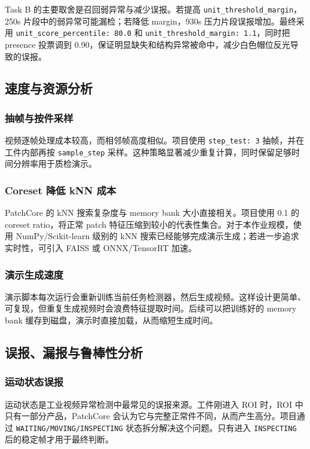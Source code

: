 \documentclass[12pt,hyperref,a4paper,UTF8,fontset=fandol]{ctexart}
\begin{document}
Task B 的主要取舍是召回弱异常与减少误报。若提高 \texttt{unit\_threshold\_margin}，250s 片段中的弱异常可能漏检；若降低 margin，930s 压力片段误报增加。最终采用 \texttt{unit\_score\_percentile: 80.0} 和 \texttt{unit\_threshold\_margin: 1.1}，同时把 presence 投票调到 0.90，保证明显缺失和结构异常被命中，减少白色帽位反光导致的误报。

\newpage
\subsection{速度与资源分析}

\subsubsection{抽帧与按件采样}

视频逐帧处理成本较高，而相邻帧高度相似。项目使用 \texttt{step\_test: 3} 抽帧，并在工件内部再按 \texttt{sample\_step} 采样。这种策略显著减少重复计算，同时保留足够时间分辨率用于质检演示。

\subsubsection{Coreset 降低 kNN 成本}

PatchCore 的 kNN 搜索复杂度与 memory bank 大小直接相关。项目使用 0.1 的 coreset ratio，将正常 patch 特征压缩到较小的代表性集合。对于本作业规模，使用 NumPy/Scikit-learn 级别的 kNN 搜索已经能够完成演示生成；若进一步追求实时性，可引入 FAISS 或 ONNX/TensorRT 加速。

\subsubsection{演示生成速度}

演示脚本每次运行会重新训练当前任务检测器，然后生成视频。这样设计更简单、可复现，但重复生成视频时会浪费特征提取时间。后续可以把训练好的 memory bank 缓存到磁盘，演示时直接加载，从而缩短生成时间。

\newpage
\subsection{误报、漏报与鲁棒性分析}

\subsubsection{运动状态误报}

运动状态是工业视频异常检测中最常见的误报来源。工件刚进入 ROI 时，ROI 中只有一部分产品，PatchCore 会认为它与完整正常件不同，从而产生高分。项目通过 \texttt{WAITING/MOVING/INSPECTING} 状态拆分解决这个问题。只有进入 \texttt{INSPECTING} 后的稳定帧才用于最终判断。
\end{document}
